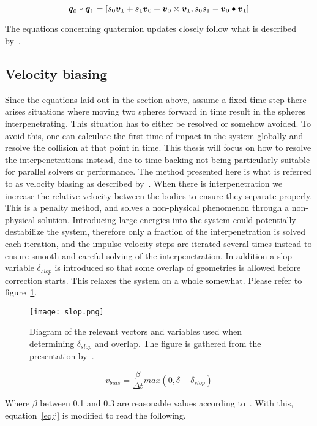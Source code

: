 \begin{equation}\label{eq:quatMult}
  \boldsymbol{q}_0*\boldsymbol{q}_1 = [s_0\boldsymbol{v}_1+s_1\boldsymbol{v}_0+\boldsymbol{v}_0\times \boldsymbol{v}_1,s_0s_1-\boldsymbol{v}_0\bullet \boldsymbol{v}_1]
\end{equation}

The equations concerning quaternion updates closely follow what is described by~\cite{fossum}.
\subsection{Velocity biasing}
Since the equations laid out in the section above, assume a fixed time step there
arises situations where moving two spheres forward in time result in the spheres
interpenetrating. This situation has to either be resolved or somehow avoided.
To avoid this, one can calculate the first time of impact in the system globally and
resolve the collision at that point in time. This thesis will focus on how to resolve
the interpenetrations instead, due to time-backing not being particularly suitable
for parallel solvers or performance.
The method presented here is what is referred to as velocity biasing as described by~\cite{catto2006}.
When there is interpenetration we increase the relative velocity between the bodies
to ensure they separate properly. This is a penalty method, and solves a non-physical
phenomenon through a non-physical solution. Introducing large energies into the
system could potentially destabilize the system, therefore only a fraction of the
interpenetration is solved each iteration, and the impulse-velocity steps are iterated
several times instead to ensure smooth and careful solving of the interpenetration.
In addition a slop variable $\delta_{slop}$ is introduced so that some overlap of geometries
is allowed before correction starts. This relaxes the system on a whole somewhat.
Please refer to figure~\ref{fig:slop}.

\begin{figure}[H]
  \centering
  \texttt{[image: slop.png]}
  \caption{Diagram of the relevant vectors and variables used when determining $\delta_{slop}$ and
  overlap. The figure is gathered from the presentation by~\cite{catto2006}.}
  \label{fig:slop}
\end{figure}

\begin{equation}
  v_{bias} = \frac{\beta}{\Delta t}max(0, \delta-\delta_{slop})
\end{equation}

Where $\beta$ between 0.1 and 0.3 are reasonable values according to~\cite{catto2006}.
With this, equation~\ref{eq:j} is modified to read the following.

